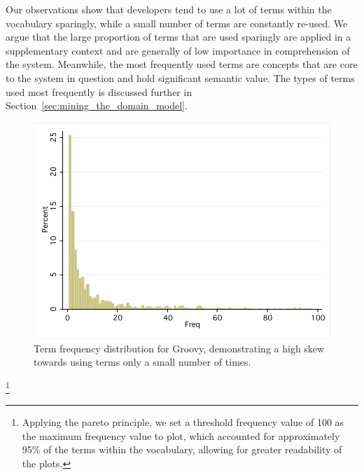 Our observations show that developers tend to use a lot of terms within the vocabulary sparingly, while a small number of terms are constantly re-used. We argue that the large proportion of terms that are used sparingly are applied in a supplementary context and are generally of low importance in comprehension of the system. Meanwhile, the most frequently used terms are concepts that are core to the system in question and hold significant semantic value. The types of terms used most frequently is discussed further in Section~\ref{sec:mining_the_domain_model}.

\begin{figure}[t]
\centering
\includegraphics[width=\textwidth]{Figures/Vocab-GroovyFreqDist.pdf}
\caption{Term frequency distribution for Groovy, demonstrating a high skew towards using terms only a small number of times.}
\label{fig:vocab-freq-dist-groovy}
\end{figure}
\footnote{Applying the pareto principle, we set a threshold frequency value of 100 as the maximum frequency value to plot, which accounted for approximately 95\% of the terms within the vocabulary, allowing for greater readability of the plots.}

